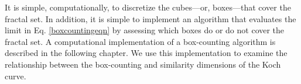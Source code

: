 It is simple, computationally, to discretize the cubes---or, boxes---that cover the fractal set. In addition, it is simple to implement an algorithm that evaluates the limit in Eq. \ref{boxcountingeqn} by assessing which boxes do or do not cover the fractal set. A computational implementation of a box-counting algorithm is described in the following chapter. We use this implementation to examine the relationship between the box-counting and similarity dimensions of the Koch curve.































